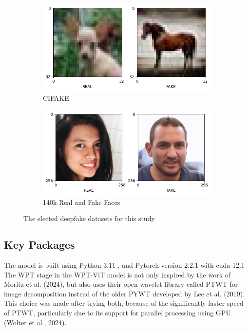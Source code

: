 \documentclass{svproc}
\begin{document}
\begin{figure}[H]
  \centering
  \begin{subfigure}{.5\textwidth}
    \centering
    \includegraphics[width=0.9\linewidth]{figures/dataset_CIFAKE.png}
    \caption{CIFAKE}
    \label{fig:sub1}
  \end{subfigure}%
  \begin{subfigure}{.5\textwidth}
    \centering
    \includegraphics[width=0.9\linewidth]{figures/dataset_RVSF.png}
    \caption{140k Real and Fake Faces}
    \label{fig:sub2}
  \end{subfigure}
  \caption{The elected deepfake datasets for this study}
  \label{fig:test}
\end{figure}

\subsection{Key Packages}
The model is built using Python 3.11 , and Pytorch version 2.2.1 with cuda 12.1
The WPT stage in the WPT-ViT model is not only inspired by the work of Moritz
et al. (2024), but also uses their open wavelet library called PTWT for image
decomposition instead of the older PYWT developed by Lee et al. (2019). This
choice was made after trying both, because of the significantly faster speed of
PTWT, particularly due to its support for parallel processing using GPU (Wolter
et al., 2024).
\end{document}
